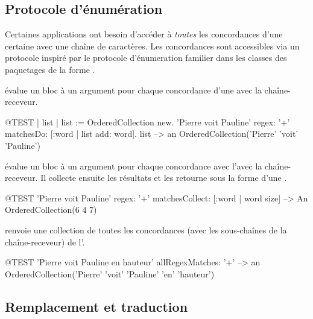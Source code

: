\documentclass[a4paper,10pt,twoside]{book}
\begin{document}
{%
\subsection{Protocole d'énumération}

Certaines applications ont besoin d'accéder à \emph{toutes} les
concordances d'une certaine \expreg avec une chaîne de caractères.
Les concordances sont accessibles via un protocole inspiré par le
protocole d'énumeration 
familier dans les classes des paquetages de la forme .

 évalue un bloc à un argument pour
chaque concordance d'une \expreg avec la chaîne-receveur.

\begin{code}{@TEST | list |}
list := OrderedCollection new.
'Pierre voit Pauline' regex: '\w+' matchesDo: [:word | list add: word].
list --> an OrderedCollection('Pierre' 'voit' 'Pauline')
\end{code}

 évalue un bloc à un argument
pour chaque concordance avec l'\expreg avec la chaîne-receveur. Il
collecte ensuite les résultats et les retourne sous la forme d'une
 .

\begin{code}{@TEST}
'Pierre voit Pauline' regex: '\w+' matchesCollect: [:word | word size]                          --> An OrderedCollection(6 4 7)
\end{code}

 renvoie une collection de toutes les
concordances (avec les sous-chaînes de la chaîne-receveur) de l'\expreg.

\begin{code}{@TEST}
'Pierre voit Pauline en hauteur' allRegexMatches: '\w+' --> an OrderedCollection('Pierre' 'voit' 'Pauline' 'en' 'hauteur')
\end{code}

\subsection{Remplacement et traduction}

}
\end{document}
